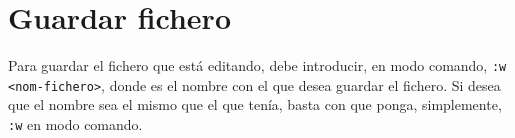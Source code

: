 \section{Guardar fichero}\label{sec:vim-guardar}
Para guardar el fichero que está editando, debe introducir, en modo comando, \lstinline!:w <nom-fichero>!,
donde  es el nombre con el que desea guardar el fichero. Si desea que el nombre sea el mismo
que el que tenía, basta con que ponga, simplemente, \lstinline+:w+ en modo comando.
